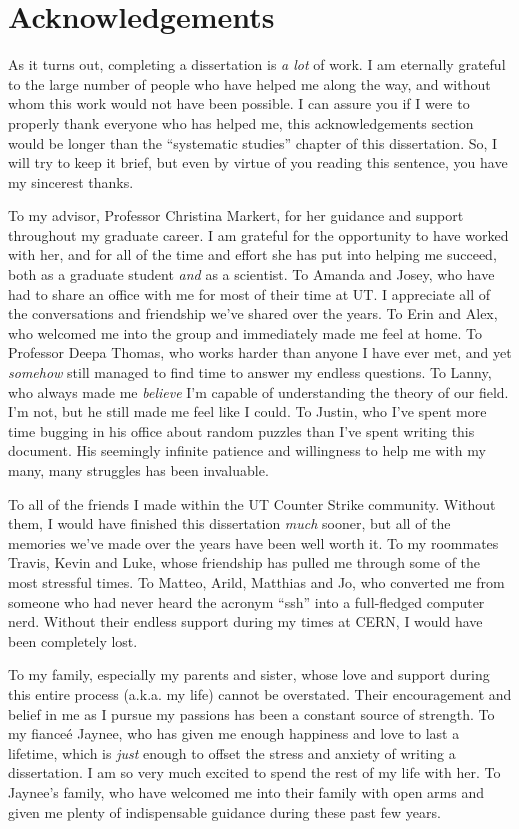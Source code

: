 \chapter{Acknowledgements}

\footnotesize
As it turns out, completing a dissertation is \textit{a lot} of work. I am eternally grateful to the large number of people who have helped me along the way, and without whom this work would not have been possible. I can assure you if I were to properly thank everyone who has helped me, this acknowledgements section would be longer than the ``systematic studies'' chapter of this dissertation. So, I will try to keep it brief, but even by virtue of you reading this sentence, you have my sincerest thanks.

To my advisor, Professor Christina Markert, for her guidance and support throughout my graduate career. I am grateful for the opportunity to have worked with her, and for all of the time and effort she has put into helping me succeed, both as a graduate student \textit{and} as a scientist. To Amanda and Josey, who have had to share an office with me for most of their time at UT. I appreciate all of the conversations and friendship we've shared over the years. To Erin and Alex, who welcomed me into the group and immediately made me feel at home. To Professor Deepa Thomas, who works harder than anyone I have ever met, and yet \textit{somehow} still managed to find time to answer my endless questions. To Lanny, who always made me \textit{believe} I'm capable of understanding the theory of our field. I'm not, but he still made me feel like I could. To Justin, who I've spent more time bugging in his office about random puzzles than I've spent writing this document. His seemingly infinite patience and willingness to help me with my many, many struggles has been invaluable.

To all of the friends I made within the UT Counter Strike community. Without them, I would have finished this dissertation \textit{much} sooner, but all of the memories we've made over the years have been well worth it. To my roommates Travis, Kevin and Luke, whose friendship has pulled me through some of the most stressful times. To Matteo, Arild, Matthias and Jo, who converted me from someone who had never heard the acronym ``ssh'' into a full-fledged computer nerd. Without their endless support during my times at CERN, I would have been completely lost. 

To my family, especially my parents and sister, whose love and support during this entire process (a.k.a. my life) cannot be overstated. Their encouragement and belief in me as I pursue my passions has been a constant source of strength. To my fiance\'e Jaynee, who has given me enough happiness and love to last a lifetime, which is \textit{just} enough to offset the stress and anxiety of writing a dissertation. I am so very much excited to spend the rest of my life with her. To Jaynee's family, who have welcomed me into their family with open arms and given me plenty of indispensable guidance during these past few years.

\normalsize